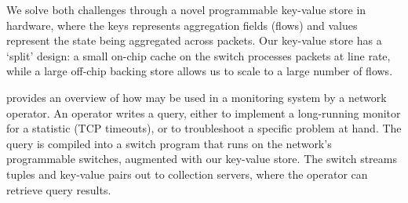 We solve both challenges through a novel programmable key-value store in
hardware, where the keys represents aggregation fields (\eg flows) and values
represent the state being aggregated across packets. Our key-value store has a
`split' design: a small on-chip cache on the switch processes packets at line
rate, while a large off-chip backing store allows us to scale to a large number
of flows.

 provides an overview of how \TheSystem may be used in a
monitoring system by a network operator. An operator writes a \TheSystem query,
either to implement a long-running monitor for a statistic (\eg TCP timeouts),
or to troubleshoot a specific problem at hand. The query is compiled into a
switch program that runs on the network's programmable switches, augmented with
our key-value store. The switch streams tuples and key-value pairs out to
collection servers, where the operator can retrieve query results.
